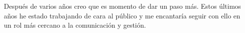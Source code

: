 

\begin{cvparagraph}

Después de varios años creo que es momento de dar un paso más. Estos últimos años he estado trabajando de cara al público y me encantaría seguir con ello en un rol más cercano a la comunicación y gestión.
\end{cvparagraph}
